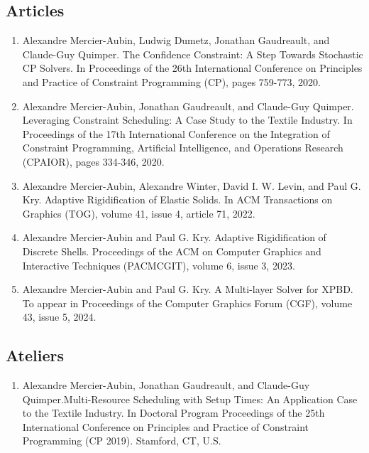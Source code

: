 \documentclass[10pt]{article} %
\begin{document}
\subsection{Articles}
%
%
\begin{enumerate}
  \setcounter{enumi}{\value{listCounter}}
  \item Alexandre Mercier-Aubin, Ludwig Dumetz, Jonathan Gaudreault, and Claude-Guy Quimper. The Confidence Constraint: A Step Towards Stochastic CP Solvers. In Proceedings of the 26th International Conference on Principles and Practice of Constraint Programming (CP), pages 759-773, 2020. 

 \item Alexandre Mercier-Aubin, Jonathan Gaudreault, and Claude-Guy Quimper. Leveraging Constraint Scheduling: A Case Study to the Textile Industry. In Proceedings of the 17th International Conference on the Integration of Constraint Programming, Artificial Intelligence, and Operations Research (CPAIOR), pages 334-346, 2020. 

 \item Alexandre Mercier-Aubin,  Alexandre Winter,  David I. W. Levin, and Paul G. Kry. Adaptive Rigidification of Elastic Solids. In ACM Transactions on Graphics (TOG), volume 41, issue 4, article 71, 2022.  

 \item Alexandre Mercier-Aubin and Paul G. Kry. Adaptive Rigidification of Discrete Shells. Proceedings of the ACM on Computer Graphics and Interactive Techniques (PACMCGIT), volume 6, issue 3, 2023. 

\item Alexandre Mercier-Aubin and Paul G. Kry. A Multi-layer Solver for XPBD. To appear in Proceedings of the Computer Graphics Forum (CGF), volume 43, issue 5, 2024.
\end{enumerate}

\subsection{Ateliers}
\begin{enumerate}
  \setcounter{enumi}{\value{listCounter}}
  \item Alexandre Mercier-Aubin, Jonathan Gaudreault, and Claude-Guy Quimper.Multi-Resource Scheduling with Setup Times:
An Application Case to the Textile Industry. In  Doctoral Program Proceedings of the 25th International
Conference on Principles and Practice of Constraint Programming (CP 2019). Stamford, CT, U.S. 

\end{enumerate}
\end{document}
